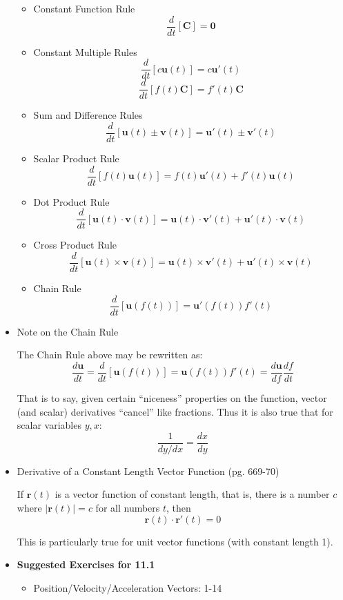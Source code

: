 \documentclass[12pt]{article}
\theoremstyle{plain}
\theoremstyle{definition}
\theoremstyle{remark}
\newcommand{\vect}[1]{\mathbf{#1}}
\begin{document}
\begin{itemize}
		\begin{itemize}
		\item Constant Function Rule
		\[\frac{d}{dt} [\vect{C}] = \vect{0}\]
		\item Constant Multiple Rules
		\[\frac{d}{dt} [c\vect{u}(t)] = c\vect{u}'(t)\]
		\[\frac{d}{dt} [f(t)\vect{C}] = f'(t)\vect{C}\]
		\item Sum and Difference Rules
		\[\frac{d}{dt} [\vect{u}(t) \pm \vect{v}(t)] = \vect{u}'(t) \pm \vect{v}'(t)\]
		\item Scalar Product Rule
		\[\frac{d}{dt} [f(t)\vect{u}(t)] = f(t)\vect{u}'(t) + f'(t)\vect{u}(t)\]
		\item Dot Product Rule
		\[\frac{d}{dt} [\vect{u}(t) \cdot \vect{v}(t)] = \vect{u}(t)\cdot\vect{v}'(t) + \vect{u}'(t)\cdot\vect{v}(t)\]
		\item Cross Product Rule
		\[\frac{d}{dt} [\vect{u}(t) \times \vect{v}(t)] = \vect{u}(t)\times\vect{v}'(t) + \vect{u}'(t)\times\vect{v}(t)\]
		\item Chain Rule
		\[\frac{d}{dt} [\vect{u}(f(t))] =\vect{u}'(f(t))f'(t)\]
		\end{itemize}
		
	\item Note on the Chain Rule
	
	The Chain Rule above may be rewritten as: \[ \frac{d\vect{u}}{dt} = \frac{d}{dt} [\vect{u}(f(t))] = \vect{u}(f(t))f'(t) = \frac{d\vect{u}}{df}\frac{df}{dt} \]
	
	That is to say, given certain ``niceness'' properties on the function, vector (and scalar) derivatives ``cancel'' like fractions. Thus it is also true that for scalar variables $y,x$: \[\frac{1}{dy/dx} = \frac{dx}{dy}\]
	
	\item Derivative of a Constant Length Vector Function (pg. 669-70)
	
	If $\vect{r}(t)$ is a vector function of constant length, that is, there is a number $c$ where $|\vect{r}(t)|=c$ for all numbers $t$, then \[\vect{r}(t) \cdot \vect{r}'(t) = 0\]
	
	This is particularly true for unit vector functions (with constant length 1).
	
	\item \textbf{Suggested Exercises for 11.1}
		\begin{itemize}
		\item Position/Velocity/Acceleration Vectors: 1-14
		\end{itemize}
	\end{itemize}
	
\end{document}
